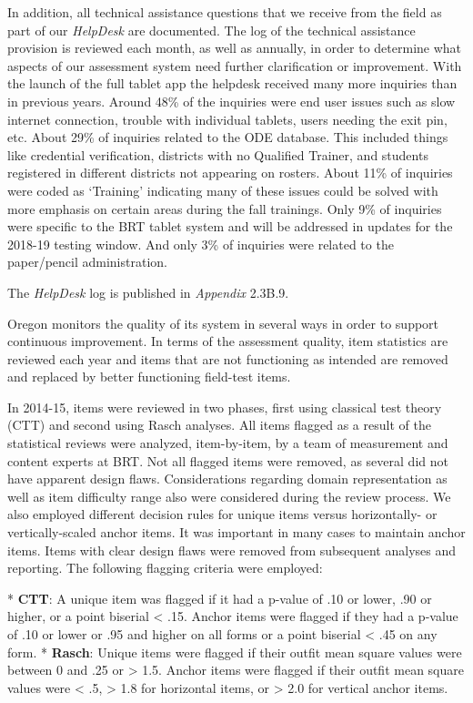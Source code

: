 \documentclass[]{article}
\begin{document}
In addition, all technical assistance questions that we receive from the
field as part of our \emph{HelpDesk} are documented. The log of the
technical assistance provision is reviewed each month, as well as
annually, in order to determine what aspects of our assessment system
need further clarification or improvement. With the launch of the full
tablet app the helpdesk received many more inquiries than in previous
years. Around 48\% of the inquiries were end user issues such as slow
internet connection, trouble with individual tablets, users needing the
exit pin, etc. About 29\% of inquiries related to the ODE database. This
included things like credential verification, districts with no
Qualified Trainer, and students registered in different districts not
appearing on rosters. About 11\% of inquiries were coded as `Training'
indicating many of these issues could be solved with more emphasis on
certain areas during the fall trainings. Only 9\% of inquiries were
specific to the BRT tablet system and will be addressed in updates for
the 2018-19 testing window. And only 3\% of inquiries were related to
the paper/pencil administration.

The \emph{HelpDesk} log is published in \emph{Appendix} 2.3B.9.

Oregon monitors the quality of its system in several ways in order to
support continuous improvement. In terms of the assessment quality, item
statistics are reviewed each year and items that are not functioning as
intended are removed and replaced by better functioning field-test
items.

In 2014-15, items were reviewed in two phases, first using classical
test theory (CTT) and second using Rasch analyses. All items flagged as
a result of the statistical reviews were analyzed, item-by-item, by a
team of measurement and content experts at BRT. Not all flagged items
were removed, as several did not have apparent design flaws.
Considerations regarding domain representation as well as item
difficulty range also were considered during the review process. We also
employed different decision rules for unique items versus horizontally-
or vertically-scaled anchor items. It was important in many cases to
maintain anchor items. Items with clear design flaws were removed from
subsequent analyses and reporting. The following flagging criteria were
employed:

\clearpage
* \textbf{CTT}: A unique item was flagged if it had a p-value of .10 or
lower, .90 or higher, or a point biserial \textless{} .15. Anchor items
were flagged if they had a p-value of .10 or lower or .95 and higher on
all forms or a point biserial \textless{} .45 on any form. *
\textbf{Rasch}: Unique items were flagged if their outfit mean square
values were between 0 and .25 or \textgreater{} 1.5. Anchor items were
flagged if their outfit mean square values were \textless{} .5,
\textgreater{} 1.8 for horizontal items, or \textgreater{} 2.0 for
vertical anchor items.
\end{document}

